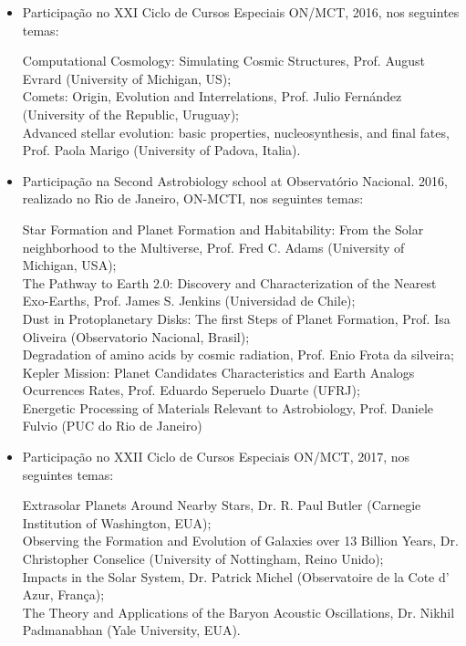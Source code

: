 \documentclass[a4paper, 11pt]{article}
\begin{document}
\begin{itemize}
  \item Participação no XXI Ciclo de Cursos Especiais ON/MCT, 2016, nos seguintes temas: 

  Computational Cosmology: Simulating Cosmic Structures, Prof. August Evrard (University of Michigan, US); \\
  Comets: Origin, Evolution and Interrelations, Prof. Julio Fernández (University of the Republic, Uruguay); \\
  Advanced stellar evolution: basic properties, nucleosynthesis, and final fates, Prof. Paola Marigo (University of Padova, Italia).

  \item Participação na Second Astrobiology school at Observatório Nacional. 2016, realizado no Rio de Janeiro, ON-MCTI, nos seguintes temas: 

  Star Formation and Planet Formation and Habitability: From the Solar neighborhood to the Multiverse, Prof. Fred C. Adams (University of Michigan, USA); \\ The Pathway to Earth 2.0: Discovery and Characterization of the Nearest Exo-Earths, Prof. James S. Jenkins (Universidad de Chile); \\
  Dust in Protoplanetary Disks: The first Steps of Planet Formation, Prof. Isa Oliveira (Observatorio Nacional, Brasil); \\
  Degradation of amino acids by cosmic radiation, Prof. Enio Frota da silveira; \\
  Kepler Mission: Planet Candidates Characteristics and Earth Analogs Ocurrences Rates, Prof. Eduardo Seperuelo Duarte (UFRJ); \\
  Energetic Processing of Materials Relevant to Astrobiology, Prof. Daniele Fulvio (PUC do Rio de Janeiro)
  

  \item Participação no XXII Ciclo de Cursos Especiais ON/MCT, 2017, nos seguintes temas: 

  Extrasolar Planets Around Nearby Stars, Dr. R. Paul Butler (Carnegie Institution of Washington, EUA); \\
  Observing the Formation and Evolution of Galaxies over 13 Billion Years, Dr. Christopher Conselice (University of Nottingham, Reino Unido); \\
  Impacts in the Solar System, Dr. Patrick Michel (Observatoire de la Cote d' Azur, França); \\
  The Theory and Applications of the Baryon Acoustic Oscillations, Dr. Nikhil Padmanabhan (Yale University, EUA).
\end{itemize}
\end{document}
